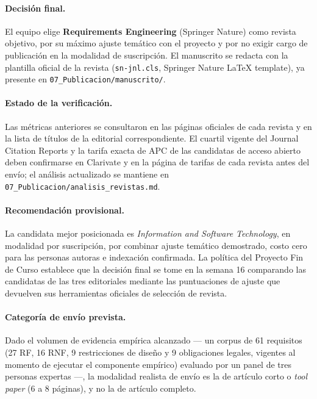 \documentclass[journal,onecolumn]{IEEEtran}
\begin{document}
	\paragraph{Decisión final.}
	El equipo elige \textbf{Requirements Engineering} (Springer Nature) como
	revista objetivo, por su máximo ajuste temático con el proyecto y por no
	exigir cargo de publicación en la modalidad de suscripción. El
	manuscrito se redacta con la plantilla oficial de la revista
	(\texttt{sn-jnl.cls}, Springer Nature LaTeX template), ya presente en
	\texttt{07\_Publicacion/manuscrito/}.

	\paragraph{Estado de la verificación.}
	Las métricas anteriores se consultaron en las páginas oficiales de cada
	revista y en la lista de títulos de la editorial correspondiente. El cuartil
	vigente del Journal Citation Reports y la tarifa exacta de APC de las
	candidatas de acceso abierto deben confirmarse en Clarivate y en la página de
	tarifas de cada revista antes del envío; el análisis actualizado se mantiene
	en \texttt{07\_Publicacion/analisis\_revistas.md}.
	
	\paragraph{Recomendación provisional.}
	La candidata mejor posicionada es \emph{Information and Software Technology},
	en modalidad por suscripción, por combinar ajuste temático demostrado, costo
	cero para las personas autoras e indexación confirmada. La política del
	Proyecto Fin de Curso establece que la decisión final se tome en la semana 16
	comparando las candidatas de las tres editoriales mediante las puntuaciones
	de ajuste que devuelven sus herramientas oficiales de selección de revista.
	
	\paragraph{Categoría de envío prevista.}
	Dado el volumen de evidencia empírica alcanzado --- un corpus de 61
	requisitos (27 RF, 16 RNF, 9 restricciones de diseño y 9 obligaciones
	legales, vigentes al momento de ejecutar el componente empírico)
	evaluado por un panel de tres personas expertas ---, la modalidad
	realista de envío es la de artículo corto o \emph{tool paper}
	(6 a 8 páginas), y no la de artículo completo.
	
\end{document}

